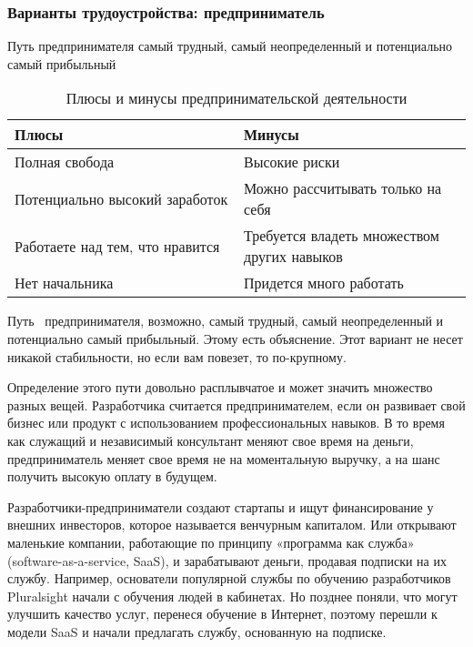 \documentclass{../industrial-development}
\begin{document}
\begin{frame} \frametitle{Варианты трудоустройства: предприниматель}
  \begin{block}{}
 Путь предпринимателя самый трудный, самый неопределенный и потенциально самый прибыльный
  \end{block}
  
  \begin{table}[H]
\caption{\label{tab:canonsummary} Плюсы и минусы предпринимательской деятельности }
\begin{center}
\begin{tabular}{|p{0.5\linewidth}|p{0.5\linewidth}|}
\hline
\textbf{Плюсы} & \textbf{Минусы} \\
\hline
Полная свобода &  Высокие риски \\
\hline
Потенциально высокий заработок  & Можно рассчитывать только на себя \\
\hline
Работаете над тем, что нравится & Требуется владеть множеством других навыков \\
\hline
Нет начальника  & Придется много работать \\
\hline
\end{tabular}
\end{center}
\end{table} 

\end{frame}

\lecturenotes

Путь~\cite[с.~62--67]{Sonmez} предпринимателя, возможно, самый трудный, самый неопределенный и потенциально самый прибыльный. Этому есть объяснение. Этот вариант не несет никакой стабильности, но если вам повезет, то по-крупному.

Определение этого пути довольно расплывчатое и может значить множество разных вещей. Разработчика считается предпринимателем, если он развивает свой бизнес или продукт с использованием профессиональных навыков. В то время как служащий и независимый консультант меняют свое время на деньги, предприниматель меняет свое время не на моментальную выручку, а на шанс получить высокую оплату в будущем.

Разработчики-предприниматели создают стартапы и ищут финансирование у внешних инвесторов, которое называется венчурным капиталом. Или открывают маленькие компании, работающие по принципу «программа как служба» (software-as-a-service, SaaS), и зарабатывают деньги, продавая подписки на их службу. Например, основатели популярной службы по обучению разработчиков Pluralsight начали с обучения людей в кабинетах. Но позднее поняли, что могут улучшить качество услуг, перенеся обучение в Интернет, поэтому перешли к модели SaaS и начали предлагать службу, основанную на подписке.
\end{document}

